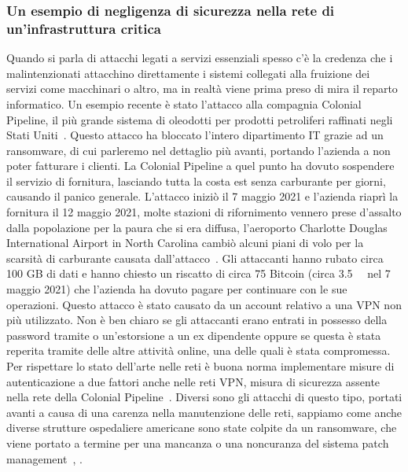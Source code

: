            \subsubsection{Un esempio di negligenza di sicurezza nella rete di un'infrastruttura critica}
                Quando si parla di attacchi legati a servizi essenziali spesso c'è la credenza che i malintenzionati attacchino direttamente i sistemi collegati alla fruizione dei servizi come macchinari o altro, ma in realtà viene prima preso di mira il reparto informatico.
                Un esempio recente è stato l'attacco alla compagnia Colonial 
                Pipeline, il più grande sistema di oleodotti per prodotti 
                petroliferi raffinati negli Stati Uniti~\cite{wiki_colonial_pipeline}.
                Questo attacco ha bloccato l'intero dipartimento IT grazie ad un ransomware, di cui parleremo nel dettaglio più avanti, portando l'azienda a non poter fatturare i clienti. La 
                Colonial Pipeline a quel punto ha dovuto sospendere il servizio di fornitura, lasciando tutta la costa est senza carburante per giorni, causando il panico generale. L'attacco iniziò il 7 maggio 2021 e l'azienda riaprì la fornitura il 12 maggio 2021, molte stazioni di rifornimento vennero prese d'assalto dalla popolazione per la paura che si era diffusa, l'aeroporto Charlotte Douglas International Airport in North Carolina cambiò alcuni piani di volo per la scarsità di carburante causata dall'attacco~\cite{airport_reschedule_flights_fuel_shortage}.
                Gli attaccanti hanno rubato circa 100 GB di dati e hanno chiesto un riscatto di circa 75 Bitcoin (circa \SI{3.5}{\million\EUR} nel 7 maggio 2021) che l'azienda ha dovuto pagare per continuare con le sue operazioni.
                Questo attacco è stato causato da un account relativo a una VPN non più utilizzato. Non è ben chiaro se gli attaccanti erano entrati in possesso della password tramite o un'estorsione a un ex dipendente oppure se questa è stata reperita tramite delle altre attività online, una delle quali è stata compromessa.
                Per rispettare lo stato dell'arte nelle reti è buona norma 
                implementare misure di autenticazione a due fattori
                anche nelle reti VPN, misura di sicurezza assente nella rete della Colonial Pipeline~\cite{colonial_pipeline_attack}. Diversi sono gli attacchi di questo tipo, portati avanti a causa di una carenza nella manutenzione delle reti, sappiamo come anche diverse strutture ospedaliere americane sono state colpite da un ransomware, che viene portato a termine per una mancanza o una noncuranza del sistema patch management~\cite{us_hospital_ransomware}, \cite{healthcare_us_ransomware_2}.

